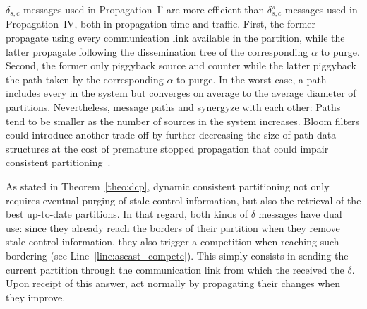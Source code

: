 $\delta_{s, c}$ messages used in Propagation~I' are more efficient
than $\delta_{s, c}^\pi$ messages used in Propagation~IV, both in
propagation time and traffic. First, the former propagate using every
communication link available in the partition, while the latter
propagate following the dissemination tree of the corresponding
$\alpha$ to purge. Second, the former only piggyback source and
counter while the latter piggyback the path taken by the corresponding
$\alpha$ to purge.  In the worst case, a path includes every
\processes in the system but converges on average to the average
diameter of partitions. Nevertheless, message paths and \NAME
synergyze with each other: Paths tend to be smaller as the number of
sources in the system increases. Bloom filters could introduce another
trade-off by further decreasing the size of path data structures at
the cost of premature stopped propagation that could impair consistent
partitioning~\cite{whitaker2002forwarding}.

As stated in Theorem~\ref{theo:dcp}, dynamic consistent partitioning
not only requires eventual purging of stale control information, but
also the retrieval of the best up-to-date partitions. In that regard,
both kinds of $\delta$ messages have dual use: since they already
reach the borders of their partition when they remove stale control
information, they also trigger a competition when reaching such
bordering \processes (see Line~\ref{line:ascast_compete}). This simply
consists in sending the current partition through the communication
link from which the \process received the $\delta$. Upon receipt of
this answer, \processes act normally by propagating their changes when
they improve.

